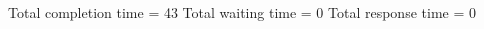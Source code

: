\begin{RTGrid}[width=0.8\textwidth]{5}{20}
\end{RTGrid}\newline\newline
Total completion time = 43\newline
Total waiting time = 0\newline
Total response time = 0\newline
